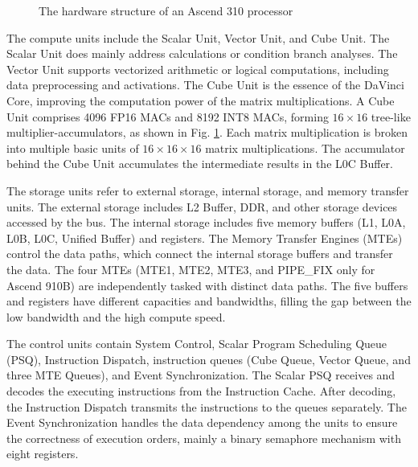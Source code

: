 \begin{figure}[tb]
    \caption{The hardware structure of an Ascend 310 processor}
    \label{fig:a310}
    \end{figure}

The compute units include the Scalar Unit, Vector Unit, and Cube Unit. The Scalar Unit does mainly address calculations or condition branch analyses. The Vector Unit supports vectorized arithmetic or logical computations, including data preprocessing and activations. The Cube Unit is the essence of the DaVinci Core, improving the computation power of the matrix multiplications. A Cube Unit comprises 4096 FP16 MACs and 8192 INT8 MACs, forming $16 \times 16$ tree-like multiplier-accumulators, as shown in Fig. \ref{fig:a310}. Each matrix multiplication is broken into multiple basic units of $16 \times 16 \times 16$ matrix multiplications. The accumulator behind the Cube Unit accumulates the intermediate results in the L0C Buffer.

The storage units refer to external storage, internal storage, and memory transfer units. The external storage includes L2 Buffer, DDR, and other storage devices accessed by the bus. The internal storage includes five memory buffers (L1, L0A, L0B, L0C, Unified Buffer) and registers. The Memory Transfer Engines (MTEs) control the data paths, which connect the internal storage buffers and transfer the data. The four MTEs (MTE1, MTE2, MTE3, and PIPE\_FIX only for Ascend 910B) are independently tasked with distinct data paths. The five buffers and registers have different capacities and bandwidths, filling the gap between the low bandwidth and the high compute speed. 
        
The control units contain System Control, Scalar Program Scheduling Queue (PSQ), Instruction Dispatch, instruction queues (Cube Queue, Vector Queue, and three MTE Queues), and Event Synchronization. The Scalar PSQ receives and decodes the executing instructions from the Instruction Cache. After decoding, the Instruction Dispatch transmits the instructions to the queues separately. The Event Synchronization handles the data dependency among the units to ensure the correctness of execution orders, mainly a binary semaphore mechanism with eight registers. 

